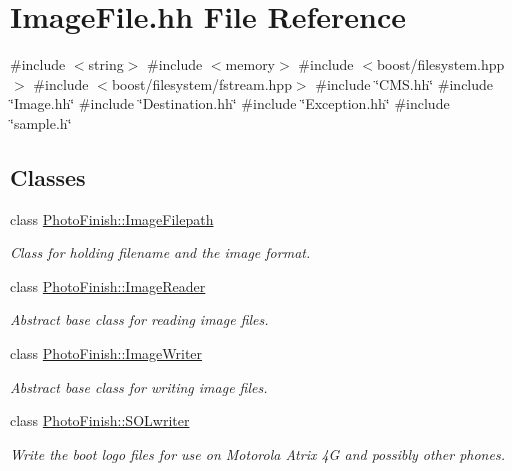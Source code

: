 \hypertarget{_image_file_8hh}{}\section{Image\+File.\+hh File Reference}
\label{_image_file_8hh}
{\ttfamily \#include $<$string$>$}\newline
{\ttfamily \#include $<$memory$>$}\newline
{\ttfamily \#include $<$boost/filesystem.\+hpp$>$}\newline
{\ttfamily \#include $<$boost/filesystem/fstream.\+hpp$>$}\newline
{\ttfamily \#include \char`\"{}C\+M\+S.\+hh\char`\"{}}\newline
{\ttfamily \#include \char`\"{}Image.\+hh\char`\"{}}\newline
{\ttfamily \#include \char`\"{}Destination.\+hh\char`\"{}}\newline
{\ttfamily \#include \char`\"{}Exception.\+hh\char`\"{}}\newline
{\ttfamily \#include \char`\"{}sample.\+h\char`\"{}}\newline
\subsection*{Classes}
\begin{DoxyCompactItemize}
\item 
class \hyperlink{class_photo_finish_1_1_image_filepath}{Photo\+Finish\+::\+Image\+Filepath}
\begin{DoxyCompactList}\small\item\em Class for holding filename and the image format. \end{DoxyCompactList}\item 
class \hyperlink{class_photo_finish_1_1_image_reader}{Photo\+Finish\+::\+Image\+Reader}
\begin{DoxyCompactList}\small\item\em Abstract base class for reading image files. \end{DoxyCompactList}\item 
class \hyperlink{class_photo_finish_1_1_image_writer}{Photo\+Finish\+::\+Image\+Writer}
\begin{DoxyCompactList}\small\item\em Abstract base class for writing image files. \end{DoxyCompactList}\item 
class \hyperlink{class_photo_finish_1_1_s_o_lwriter}{Photo\+Finish\+::\+S\+O\+Lwriter}
\begin{DoxyCompactList}\small\item\em Write the boot logo files for use on Motorola Atrix 4G and possibly other phones. \end{DoxyCompactList}\end{DoxyCompactItemize}
